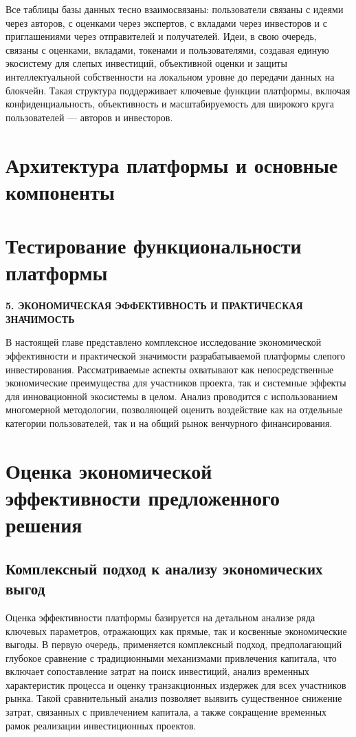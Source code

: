 \documentclass[
    candidate, %
    subf, %
    dotsinheaders=false,
]{disser}
\begin{document}
Все таблицы базы данных тесно взаимосвязаны: пользователи связаны с идеями через авторов, с оценками через экспертов, с вкладами через инвесторов и с приглашениями через отправителей и получателей. Идеи, в свою очередь, связаны с оценками, вкладами, токенами и пользователями, создавая единую экосистему для слепых инвестиций, объективной оценки и защиты интеллектуальной собственности на локальном уровне до передачи данных на блокчейн. Такая структура поддерживает ключевые функции платформы, включая конфиденциальность, объективность и масштабируемость для широкого круга пользователей — авторов и инвесторов.

\section{Архитектура платформы и основные компоненты}

\section{Тестирование функциональности платформы}

\newpage
\begin{center}
  \textbf{5. ЭКОНОМИЧЕСКАЯ ЭФФЕКТИВНОСТЬ И ПРАКТИЧЕСКАЯ ЗНАЧИМОСТЬ}
\end{center}

В настоящей главе представлено комплексное исследование экономической эффективности и практической значимости разрабатываемой платформы слепого инвестирования. Рассматриваемые аспекты охватывают как непосредственные экономические преимущества для участников проекта, так и системные эффекты для инновационной экосистемы в целом. Анализ проводится с использованием многомерной методологии, позволяющей оценить воздействие как на отдельные категории пользователей, так и на общий рынок венчурного финансирования.

\section{Оценка экономической эффективности предложенного решения}

\subsection{Комплексный подход к анализу экономических выгод}
Оценка эффективности платформы базируется на детальном анализе ряда ключевых параметров, отражающих как прямые, так и косвенные экономические выгоды. В первую очередь, применяется комплексный подход, предполагающий глубокое сравнение с традиционными механизмами привлечения капитала, что включает сопоставление затрат на поиск инвестиций, анализ временных характеристик процесса и оценку транзакционных издержек для всех участников рынка. Такой сравнительный анализ позволяет выявить существенное снижение затрат, связанных с привлечением капитала, а также сокращение временных рамок реализации инвестиционных проектов.
\end{document}
